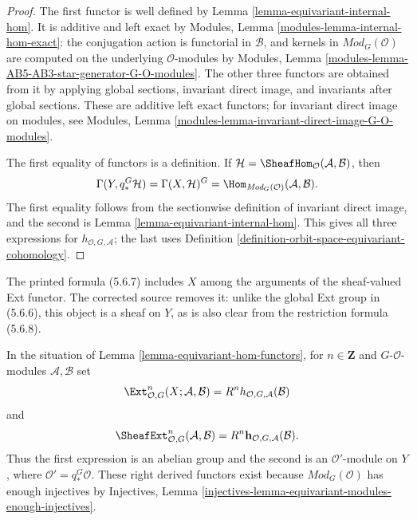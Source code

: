\begin{proof}
The first functor is well defined by Lemma
\ref{lemma-equivariant-internal-hom}. It is additive and left exact by
Modules, Lemma \ref{modules-lemma-internal-hom-exact}: the conjugation
action is functorial in $\mathcal B$, and kernels in
$\textit{Mod}_G(\mathcal O)$ are computed on the underlying
$\mathcal O$-modules by Modules, Lemma
\ref{modules-lemma-AB5-AB3-star-generator-G-O-modules}. The other three
functors are obtained from it by applying global sections, invariant direct
image, and invariants after global sections. These are additive left exact
functors; for invariant direct image on modules, see Modules, Lemma
\ref{modules-lemma-invariant-direct-image-G-O-modules}.

The first equality of functors is a definition. If
$\mathcal H=\SheafHom_{\mathcal O}(\mathcal A,\mathcal B)$, then
$$
\Gamma(Y,q_*^G\mathcal H)
=\Gamma(X,\mathcal H)^G
=\Hom_{\textit{Mod}_G(\mathcal O)}(\mathcal A,\mathcal B).
$$
The first equality follows from the sectionwise definition of invariant
direct image, and the second is Lemma
\ref{lemma-equivariant-internal-hom}. This gives all three expressions for
$h_{\mathcal O,G,\mathcal A}$; the last uses Definition
\ref{definition-orbit-space-equivariant-cohomology}.
\end{proof}


\begin{definition}
\label{definition-equivariant-ext}
\begin{reference}
\cite[Chapter V, \S 5.6, p. 214]{Tohoku}
\end{reference}
\begin{history}
The printed formula (5.6.7) includes $X$ among the arguments of the
sheaf-valued Ext functor. The corrected source removes it: unlike the global
Ext group in (5.6.6), this object is a sheaf on $Y$, as is also clear from
the restriction formula (5.6.8).
\end{history}
In the situation of Lemma \ref{lemma-equivariant-hom-functors}, for
$n \in \mathbf Z$ and $G$-$\mathcal O$-modules $\mathcal A,\mathcal B$ set
$$
\Ext^n_{\mathcal O,G}(X;\mathcal A,\mathcal B)
=
R^nh_{\mathcal O,G,\mathcal A}(\mathcal B)
$$
and
$$
\SheafExt^n_{\mathcal O,G}(\mathcal A,\mathcal B)
=
R^n\mathbf h_{\mathcal O,G,\mathcal A}(\mathcal B).
$$
Thus the first expression is an abelian group and the second is an
$\mathcal O'$-module on $Y$, where $\mathcal O'=q_*^G\mathcal O$.
These right derived functors exist because $\textit{Mod}_G(\mathcal O)$
has enough injectives by Injectives, Lemma
\ref{injectives-lemma-equivariant-modules-enough-injectives}.
\end{definition}

